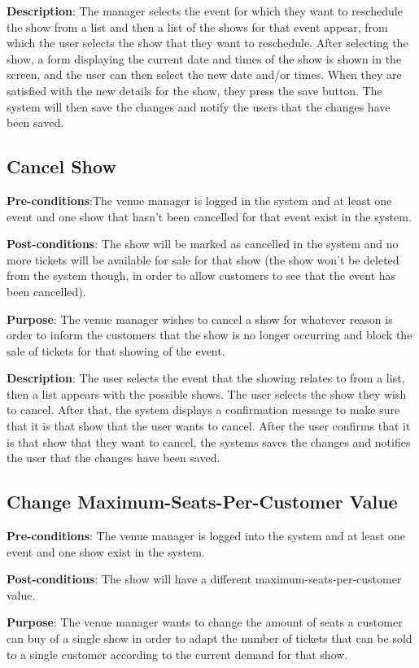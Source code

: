 \textbf{Description}: The manager selects the event for which they want to reschedule the show from a list and then a list of the shows for that event appear, from which the user selects the show that they want to reschedule. After selecting the show, a form displaying the current date and times of the show is shown in the screen, and the user can then select the new date and/or times. When they are satisfied with the new details for the show, they press the save button. The system will then save the changes and notify the users that the changes have been saved.

\subsection{Cancel Show}
\textbf{Pre-conditions}:The venue manager is logged in the system and at least one event and one show that hasn't been cancelled for that event exist in the system.

\textbf{Post-conditions}: The show will be marked as cancelled in the system and no more tickets will be available for sale for that show (the show won't be deleted from the system though, in order to allow customers to see that the event has been cancelled).

\textbf{Purpose}: The venue manager wishes to cancel a show for whatever reason is order to inform the customers that the show is no longer occurring and block the sale of tickets for that showing of the event.

\textbf{Description}: The user selects the event that the showing relates to from a list, then a list appears with the possible shows. The user selects the show they wish to cancel. After that, the system displays a confirmation message to make sure that it is that show that the user wants to cancel. After the user confirms that it is that show that they want to cancel, the systems saves the changes and notifies the user that the changes have been saved.

\subsection{Change Maximum-Seats-Per-Customer Value}
\textbf{Pre-conditions}: The venue manager is logged into the system and at least one event and one show exist in the system.

\textbf{Post-conditions}: The show will have a different maximum-seats-per-customer value.

\textbf{Purpose}: The venue manager wants to change the amount of seats a customer can buy of a single show in order to adapt the number of tickets that can be sold to a single customer according to the current demand for that show.

